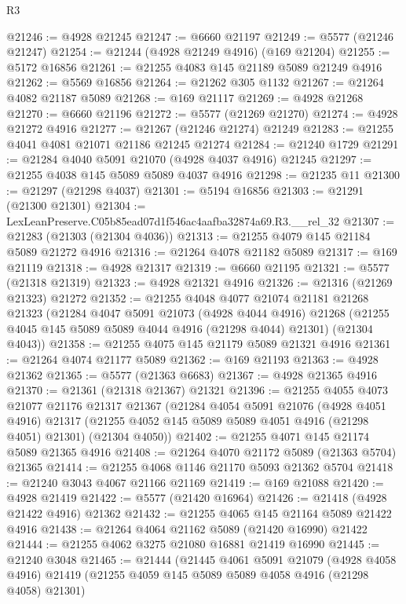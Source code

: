 \begin{lexlean}{R3}
\begin{coremodule}
@21246 := @4928 @21245
@21247 := @6660 @21197
@21249 := @5577 (@21246 @21247)
@21254 := @21244 (@4928 @21249 @4916) (@169 @21204)
@21255 := @5172 @16856
@21261 := @21255 @4083 @145 @21189 @5089 @21249 @4916
@21262 := @5569 @16856
@21264 := @21262 @305 @1132
@21267 := @21264 @4082 @21187 @5089
@21268 := @169 @21117
@21269 := @4928 @21268
@21270 := @6660 @21196
@21272 := @5577 (@21269 @21270)
@21274 := @4928 @21272 @4916
@21277 := @21267 (@21246 @21274) @21249
@21283 := @21255 @4041 @4081 @21071 @21186 @21245 @21274
@21284 := @21240 @1729
@21291 := @21284 @4040 @5091 @21070 (@4928 @4037 @4916) @21245
@21297 := @21255 @4038 @145 @5089 @5089 @4037 @4916
@21298 := @21235 @11
@21300 := @21297 (@21298 @4037)
@21301 := @5194 @16856
@21303 := @21291 (@21300 @21301)
@21304 := LexLeanPreserve.C05b85ead07d1f546ac4aafba32874a69.R3.__rel_32
@21307 := @21283 (@21303 (@21304 @4036))
@21313 := @21255 @4079 @145 @21184 @5089 @21272 @4916
@21316 := @21264 @4078 @21182 @5089
@21317 := @169 @21119
@21318 := @4928 @21317
@21319 := @6660 @21195
@21321 := @5577 (@21318 @21319)
@21323 := @4928 @21321 @4916
@21326 := @21316 (@21269 @21323) @21272
@21352 := @21255
    @4048
    @4077
    @21074
    @21181
    @21268
    @21323
    (@21284
      @4047
      @5091
      @21073
      (@4928 @4044 @4916)
      @21268
      (@21255 @4045 @145 @5089 @5089 @4044 @4916 (@21298 @4044) @21301)
      (@21304 @4043))
@21358 := @21255 @4075 @145 @21179 @5089 @21321 @4916
@21361 := @21264 @4074 @21177 @5089
@21362 := @169 @21193
@21363 := @4928 @21362
@21365 := @5577 (@21363 @6683)
@21367 := @4928 @21365 @4916
@21370 := @21361 (@21318 @21367) @21321
@21396 := @21255
    @4055
    @4073
    @21077
    @21176
    @21317
    @21367
    (@21284
      @4054
      @5091
      @21076
      (@4928 @4051 @4916)
      @21317
      (@21255 @4052 @145 @5089 @5089 @4051 @4916 (@21298 @4051) @21301)
      (@21304 @4050))
@21402 := @21255 @4071 @145 @21174 @5089 @21365 @4916
@21408 := @21264 @4070 @21172 @5089 (@21363 @5704) @21365
@21414 := @21255 @4068 @1146 @21170 @5093 @21362 @5704
@21418 := @21240 @3043 @4067 @21166 @21169
@21419 := @169 @21088
@21420 := @4928 @21419
@21422 := @5577 (@21420 @16964)
@21426 := @21418 (@4928 @21422 @4916) @21362
@21432 := @21255 @4065 @145 @21164 @5089 @21422 @4916
@21438 := @21264 @4064 @21162 @5089 (@21420 @16990) @21422
@21444 := @21255 @4062 @3275 @21080 @16881 @21419 @16990
@21445 := @21240 @3048
@21465 := @21444
    (@21445
      @4061
      @5091
      @21079
      (@4928 @4058 @4916)
      @21419
      (@21255 @4059 @145 @5089 @5089 @4058 @4916 (@21298 @4058) @21301)

\end{coremodule}
\end{lexlean}
